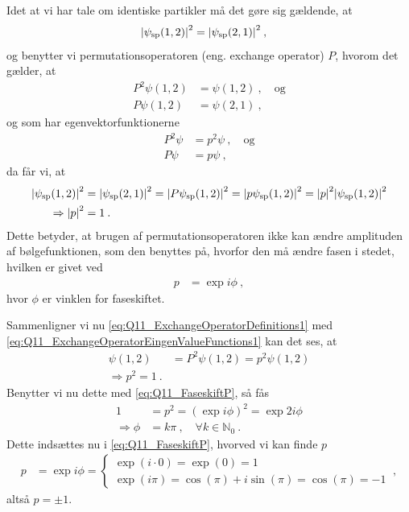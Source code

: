 Idet at vi har tale om identiske partikler må det gøre sig gældende, at
\begin{align}
    \abs{\psi_\text{sp}(1,2)}^2 &= \abs{\psi_\text{sp}(2,1)}^2 \: ,
\end{align}
og benytter vi \textsf{permutationsoperatoren} (eng. exchange operator) $P$, hvorom det gælder, at
\begin{align}
    P^2 \psi(1,2) &= \psi(1,2) \: , \quad \text{og} \label{eq:Q11_ExchangeOperatorDefinitions1} \\
    P \psi(1,2) &= \psi(2,1) \: ,\label{eq:Q11_ExchangeOperatorDefinitions2}
\end{align}
og som har egenvektorfunktionerne
\begin{align}
    P^2 \psi &= p^2 \psi \: , \quad \text{og} \label{eq:Q11_ExchangeOperatorEingenValueFunctions1} \\
    P \psi &= p \psi \: , \label{eq:Q11_ExchangeOperatorEingenValueFunctions2}
\end{align}
da får vi, at
\begin{align}
    \abs{\psi_\text{sp}(1,2)}^2 &= \abs{\psi_\text{sp}(2,1)}^2
    = \abs{P\psi_\text{sp}(1,2)}^2
    = \abs{p\psi_\text{sp}(1,2)}^2
    = \abs{p}^2 \abs{\psi_\text{sp}(1,2)}^2 \nonumber\\
    \Rightarrow \abs{p}^2 &= 1 \: .
\end{align}
Dette betyder, at brugen af permutationsoperatoren ikke kan ændre amplituden af bølgefunktionen, som den benyttes på, hvorfor den må ændre fasen i stedet, hvilken er givet ved
\begin{align} \label{eq:Q11_FaseskiftP}
    p &= \exp{i\phi} \: ,
\end{align}
hvor $\phi$ er vinklen for faseskiftet.

Sammenligner vi nu \cref{eq:Q11_ExchangeOperatorDefinitions1} med \cref{eq:Q11_ExchangeOperatorEingenValueFunctions1} kan det ses, at
\begin{align}
    \psi(1,2) &= P^2 \psi(1,2) = p^2 \psi(1,2) \nonumber\\
    \Rightarrow p^2 = 1 \: .
\end{align}
Benytter vi nu dette med \cref{eq:Q11_FaseskiftP}, så fås
\begin{align}
    1 &= p^2 = \left(\exp{i\phi}\right)^2 = \exp{2i\phi} \nonumber\\
    \Rightarrow \phi &= k\pi \: , \quad \forall k \in \mathbb{N}_0 \: .
\end{align}
Dette indsættes nu i \cref{eq:Q11_FaseskiftP}, hvorved vi kan finde $p$
\begin{align}
    p &= \exp{i\phi} =
        \begin{cases}
            \exp(i \cdot 0) = \exp(0) = 1 \\
            \exp(i\pi) = \cos(\pi) + i\sin(\pi) = \cos(\pi) = -1
        \end{cases} \: ,
\end{align}
altså $p = \pm 1$.

